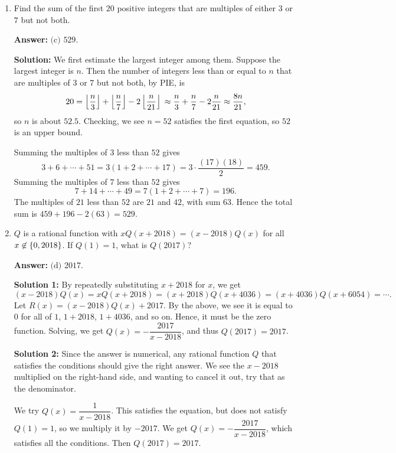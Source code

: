 \documentclass[11pt,paper=letter]{scrartcl}
\begin{document}
\begin{enumerate}[left=0pt]
\item Find the sum of the first $20$ positive integers that are multiples of either $3$ or $7$ but not both.


\textbf{Answer:} $\boxed{\text{(c) }529}$.

\textbf{Solution:} We first estimate the largest integer among them. Suppose the largest integer is $n$. Then the number of integers less than or equal to $n$ that are multiples of $3$ or $7$ but not both, by PIE, is $$
20 = \left\lfloor \frac n3 \right\rfloor + \left\lfloor \frac n7 \right\rfloor - 2\left\lfloor \frac n{21} \right\rfloor \\
 \approx \frac n3 + \frac n7 - 2\frac n{21} \\
 \approx \frac {8n}{21},
$$
so $n$ is about $52.5$. Checking, we see $n = 52$ satisfies the first equation, so $52$ is an upper bound. 

Summing the multiples of $3$ less than $52$ gives $$3 + 6 + \cdots + 51 = 3(1 + 2 + \cdots + 17) = 3\cdot \dfrac{(17)(18)}2 = 459.$$ Summing the multiples of $7$ less than $52$ gives $$7 + 14 + \cdots + 49 = 7(1 + 2 + \cdots + 7) = 196.$$ The multiples of $21$ less than $52$ are $21$ and $42$, with sum $63$. Hence the total sum is $459 + 196 - 2(63) = 529$.

\item $Q$ is a rational function with $xQ(x + 2018) = (x - 2018)Q(x)$ for all $x \not\in \left\{ 0, 2018 \right\}$. If $Q(1) = 1$, what is $Q(2017)$?


\textbf{Answer:} $\boxed{\text{(d) }2017}$.

\textbf{Solution 1:} By repeatedly substituting $x+2018$ for $x$, we get $$(x-2018)Q(x) = xQ(x+2018) = (x+2018)Q(x+4036) = (x+4036)Q(x+6054) = \cdots.$$
Let $R(x) = (x-2018)Q(x) + 2017$. By the above, we see it is equal to $0$ for all of $1$, $1+2018$, $1+4036$, and so on. Hence, it must be the zero function. Solving, we get $Q(x) = -\dfrac{2017}{x-2018}$, and thus $Q(2017) = 2017$.

\textbf{Solution 2:} Since the answer is numerical, any rational function $Q$ that satisfies the conditions should give the right answer. We see the $x-2018$ multiplied on the right-hand side, and wanting to cancel it out, try that as the denominator. 

We try $Q(x) = \dfrac1{x-2018}$. This satisfies the equation, but does not satisfy $Q(1) = 1$, so we multiply it by $-2017$. We get $Q(x) = -\dfrac{2017}{x-2018}$, which satisfies all the conditions. Then $Q(2017) = 2017$.


\end{enumerate}
\end{document}
